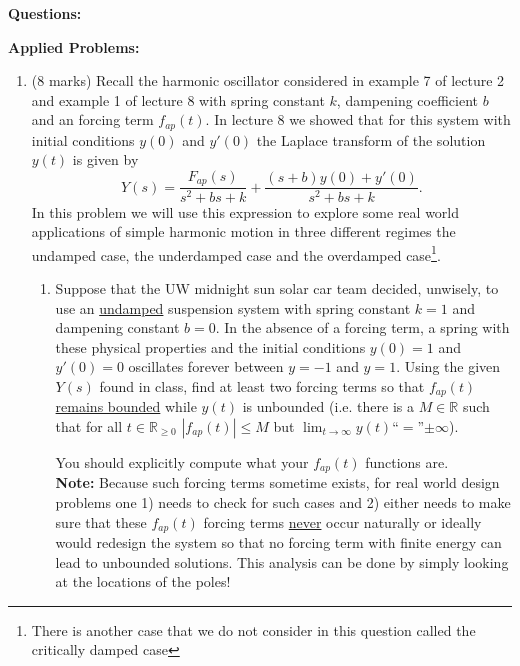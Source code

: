 \documentclass[11pt,a4paper]{article}
\begin{document}
	
	\noindent\textbf{Questions:}
	

	\begin{center}
		\textbf{Applied Problems:}
	\end{center}
	\begin{enumerate}
		
		\item (8 marks) Recall the harmonic oscillator considered in example 7 of lecture 2 and example 1 of lecture 8 with spring constant $k$, dampening coefficient $b$ and an forcing term $f_{ap}(t)$. In lecture 8 we showed that for this system with initial conditions $y(0)$ and $y'(0)$ the Laplace transform of the solution $y(t)$ is given by
		\[
		Y(s)=\frac{F_{ap}(s)}{s^2+bs+k}+ \frac{(s+b)y(0)+y'(0)}{s^2+bs+k}.
		\]
		In this problem we will use this expression to explore some real world applications of simple harmonic motion in three different regimes the undamped case, the underdamped case and the overdamped case\footnote{There is another case that we do not consider in this question called the critically damped case}.
		\begin{enumerate}
			\item Suppose that the UW midnight sun solar car team decided, unwisely, to use an \underline{undamped} suspension system with spring constant $k=1$ and dampening constant $b=0$. In the absence of a forcing term, a spring with these physical properties and the initial conditions $y(0)=1$ and $y'(0)=0$ oscillates forever between $y=-1$ and $y=1$. Using the given $Y(s)$ found in class, find at least two forcing terms so that $f_{ap}(t)$ \underline{remains bounded} while $y(t)$ is unbounded (i.e. there is a $M\in\mathbb{R}$ such that for all $t\in \mathbb{R}_{\geq0}$ $|f_{ap}(t)|\leq M$ but $\lim_{t\to\infty} y(t)$``$=$''$\pm \infty$).  
			
			You should explicitly compute what your $f_{ap}(t)$ functions are.\\
			

			
			\textbf{Note:} Because such forcing terms sometime exists, for real world design problems one 1) needs to check for such cases and 2) either needs to make sure that these $f_{ap}(t)$ forcing terms \underline{never} occur naturally or ideally would redesign the system so that no forcing term with finite energy can lead to unbounded solutions. This analysis can be done by simply looking at the locations of the poles!
			
			
			

\end{enumerate}
\end{enumerate}
\end{document}
